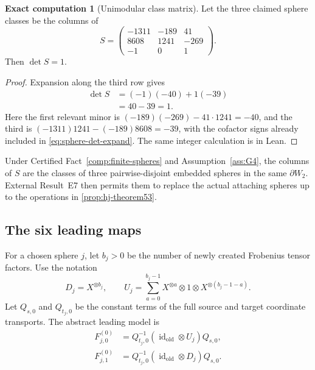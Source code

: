 \documentclass[10pt,reqno]{amsart}
\theoremstyle{definition}
\newtheorem{computation}[theorem]{Exact computation}
\theoremstyle{remark}
\newcommand{\id}{\operatorname{id}}
\begin{document}
\begin{computation}[Unimodular class matrix]\label{comp:sphere-det}
Let the three claimed sphere classes be the columns of
\begin{equation}\label{eq:sphere-matrix}
S=
\begin{pmatrix}
-1311&-189&41\\
8608&1241&-269\\
-1&0&1
\end{pmatrix}.
\end{equation}
Then $\det S=1$.
\end{computation}

\begin{proof}
Expansion along the third row gives
\begin{align}
\det S
&=(-1)(-40)+1(-39) \label{eq:sphere-det-expand}\\
&=40-39=1. \label{eq:sphere-det-value}
\end{align}
Here the first relevant minor is
$(-189)(-269)-41\cdot1241=-40$, and the third is
$(-1311)1241-(-189)8608=-39$, with the cofactor signs already included in
\cref{eq:sphere-det-expand}.  The same integer calculation is
 in Lean.
\end{proof}

Under Certified Fact~\ref{comp:finite-spheres} and Assumption~\ref{ass:G4},
the columns of $S$ are the classes of three pairwise-disjoint embedded spheres
in the same $\partial W_2$.  External Result~E7 then permits them to replace the actual attaching
spheres up to the operations in \cref{prop:hj-theorem53}.

\subsection{The six leading maps}

For a chosen sphere $j$, let $b_j>0$ be the number of newly created Frobenius tensor factors.
Use the notation
\begin{equation}\label{eq:UD-def}
D_j=X^{\otimes b_j},\qquad
U_j=\sum_{a=0}^{b_j-1}X^{\otimes a}\otimes1\otimes
X^{\otimes(b_j-1-a)}.
\end{equation}
Let $Q_{s,0}$ and $Q_{t_j,0}$ be the constant terms of the full source and
target coordinate transports.  The abstract leading model is
\begin{align}
F_{j,0}^{(0)}&=Q_{t_j,0}^{-1}
(\id_{\mathrm{old}}\otimes U_j)Q_{s,0},
\label{eq:sphere-undotted-map}\\
F_{j,1}^{(0)}&=Q_{t_j,0}^{-1}
(\id_{\mathrm{old}}\otimes D_j)Q_{s,0}.
\label{eq:sphere-dotted-map}
\end{align}
\end{document}
